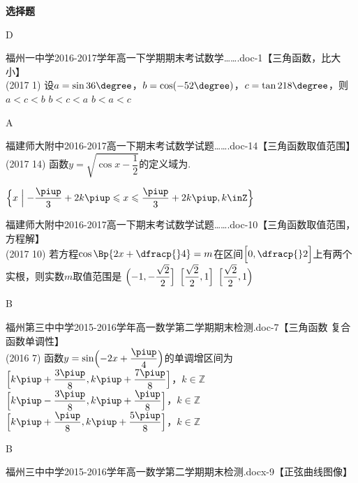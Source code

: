 \begin{exercise}{\bf 选择题}
      \begin{answer}
        D
      \end{answer}
    \item 福州一中学2016-2017学年高一下学期期末考试数学…….doc-1【三角函数，比大小】\\
      (2017  1)
      设$a=\sin36\degree$，$b=\cos(-52\degree)$，$c=\tan218\degree$，则\xz
       {$a<c<b$}
       {$b<c<a$}
       {$b<a<c$}
      \begin{answer}
        A
      \end{answer}
    \item 福建师大附中2016-2017高一下期末考试数学试题…….doc-14【三角函数取值范围】\\
      (2017  14)
      函数$y=\sqrt{\cos x-\dfrac12}$的定义域为\tk.
      \begin{answer}
        $\Bigl\{x\Bigm | -\dfrac{\piup}3+2k\piup\leqslant x\leqslant \dfrac{\piup}3+2k\piup,k\inZ \Bigr\}$
      \end{answer}
    \item 福建师大附中2016-2017高一下期末考试数学试题…….doc-10【三角函数取值范围，方程解】\\
      (2017  10)
      若方程$\cos\Bp{2x+\dfracp{}4}=m$在区间$\Bigl[0,\dfracp{}2\Bigr]$上有两个实根，则实数$m$取值范围是\xz
       {$\Bigl(-1,-\dfrac{\sqrt2}2\Bigr]$}
       {$\Bigl[\dfrac{\sqrt2}2,1\Bigr]$}
       {$\Bigl[\dfrac{\sqrt2}2,1\Bigr)$}
      \begin{answer}
        B
      \end{answer}
    \item 福州第三中中学2015-2016学年高一数学第二学期期末检测.doc-7【三角函数 复合函数单调性】\\
      (2016  7)
      函数$y=\sin\Bigl(-2x+\dfrac{\piup}4 \Bigr)$的单调增区间为\xz
       {$\Bigl[k\piup+\dfrac{3\piup}8,k\piup+\dfrac{7\piup}8 \Bigr]$，$k\in\mathbb{Z}$}
       {$\Bigl[k\piup-\dfrac{3\piup}8,k\piup+\dfrac{\piup}8 \Bigr]$，$k\in\mathbb{Z}$}
       {$\Bigl[k\piup+\dfrac{\piup}8,k\piup+\dfrac{5\piup}8 \Bigr]$，$k\in\mathbb{Z}$}
      \begin{answer}
        B
      \end{answer}
    \item 福州三中中学2015-2016学年高一数学第二学期期末检测.docx-9【正弦曲线图像】\\

\end{exercise}
